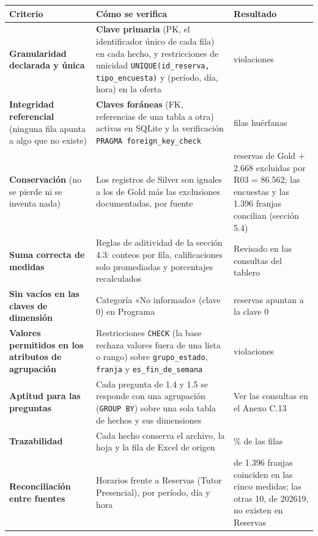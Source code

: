 \documentclass[11pt,letterpaper]{article}
\begin{document}
\begingroup\small\setlength{\tabcolsep}{4pt}\renewcommand{\arraystretch}{1.15}
\begin{longtable}{>{\raggedright\arraybackslash}p{}>{\raggedright\arraybackslash}p{}>{\raggedright\arraybackslash}p{}}
\toprule
\textbf{Criterio} & \textbf{Cómo se verifica} & \textbf{Resultado} \\
\midrule
\endhead
\textbf{Granularidad declarada y única} & \textbf{Clave primaria} (PK, el identificador único de cada fila) en cada hecho, y restricciones de unicidad \texttt{UNIQUE(id\_\allowbreak{}reserva, tipo\_\allowbreak{}encuesta)} y (período, día, hora) en la oferta & 0 violaciones \\
\textbf{Integridad referencial} (ninguna fila apunta a algo que no existe) & \textbf{Claves foráneas} (FK, referencias de una tabla a otra) activas en SQLite y la verificación \texttt{PRAGMA foreign\_\allowbreak{}key\_\allowbreak{}check} & 0 filas huérfanas \\
\textbf{Conservación} (no se pierde ni se inventa nada) & Los registros de Silver son iguales a los de Gold más las exclusiones documentadas, por fuente & 83.894 reservas de Gold + 2.668 excluidas por R03 = 86.562; las encuestas y las 1.396 franjas concilian (sección 5.4) \\
\textbf{Suma correcta de medidas} & Reglas de aditividad de la sección 4.3: conteos por fila, calificaciones solo promediadas y porcentajes recalculados & Revisado en las consultas del tablero \\
\textbf{Sin vacíos en las claves de dimensión} & Categoría «No informado» (clave 0) en Programa & 163 reservas apuntan a la clave 0 \\
\textbf{Valores permitidos en los atributos de agrupación} & Restricciones \texttt{CHECK} (la base rechaza valores fuera de una lista o rango) sobre \texttt{grupo\_\allowbreak{}estado}, \texttt{franja} y \texttt{es\_\allowbreak{}fin\_\allowbreak{}de\_\allowbreak{}semana} & 0 violaciones \\
\textbf{Aptitud para las preguntas} & Cada pregunta de 1.4 y 1.5 se responde con una agrupación (\texttt{GROUP BY}) sobre una sola tabla de hechos y sus dimensiones & Ver las consultas en el Anexo C.13 \\
\textbf{Trazabilidad} & Cada hecho conserva el archivo, la hoja y la fila de Excel de origen & 100\% de las filas \\
\textbf{Reconciliación entre fuentes} & Horarios frente a Reservas (Tutor Presencial), por período, día y hora & 1.386 de 1.396 franjas coinciden en las cinco medidas; las otras 10, de 202619, no existen en Reservas \\
\bottomrule
\end{longtable}
\endgroup
\end{document}
